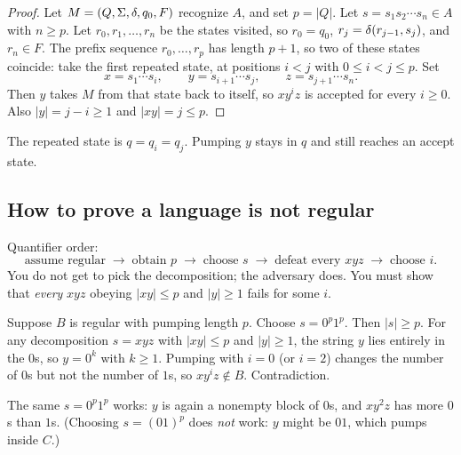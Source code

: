 \begin{proof}
Let $M=(Q,\Sigma,\delta,q_0,F)$ recognize $A$, and set $p=|Q|$. Let
$s=s_1s_2\cdots s_n\in A$ with $n\geq p$. Let $r_0,r_1,\ldots,r_n$ be the
states visited, so $r_0=q_0$, $r_{j}=\delta(r_{j-1},s_j)$, and
$r_n\in F$. The prefix sequence $r_0,\ldots,r_p$ has length $p+1$, so two of
these states coincide: take the first repeated state, at positions $i<j$
with $0\leq i<j\leq p$. Set
\[
  x=s_1\cdots s_i,\qquad
  y=s_{i+1}\cdots s_j,\qquad
  z=s_{j+1}\cdots s_n.
\]
Then $y$ takes $M$ from that state back to itself, so $xy^iz$ is accepted for
every $i\geq 0$. Also $|y|=j-i\geq 1$ and $|xy|=j\leq p$.
\end{proof}

\begin{center}
\end{center}
The repeated state is $q=q_i=q_j$. Pumping $y$ stays in $q$ and still reaches
an accept state.

\subsection{How to prove a language is not regular}
Quantifier order:
\[
  \text{assume regular}
  \;\to\;
  \text{obtain }p
  \;\to\;
  \text{choose }s
  \;\to\;
  \text{defeat every }xyz
  \;\to\;
  \text{choose }i.
\]
You do not get to pick the decomposition; the adversary does. You must show
that \emph{every} $xyz$ obeying $|xy|\leq p$ and $|y|\geq 1$ fails for some
$i$.

\begin{example}[$B=\set{0^n1^n:n\geq 0}$]
Suppose $B$ is regular with pumping length $p$. Choose $s=0^p1^p$. Then
$|s|\geq p$. For any decomposition $s=xyz$ with $|xy|\leq p$ and $|y|\geq 1$,
the string $y$ lies entirely in the $0$s, so $y=0^k$ with $k\geq 1$. Pumping
with $i=0$ (or $i=2$) changes the number of $0$s but not the number of $1$s,
so $xy^iz\notin B$. Contradiction.
\end{example}

\begin{example}[$C=\set{w:\text{equal number of }0\text{s and }1\text{s}}$]
The same $s=0^p1^p$ works: $y$ is again a nonempty block of $0$s, and
$xy^2z$ has more $0$s than $1$s. (Choosing $s=(01)^p$ does \emph{not} work:
$y$ might be $01$, which pumps inside $C$.)
\end{example}

